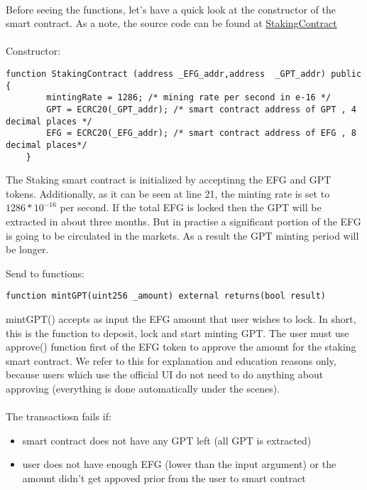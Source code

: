 \documentclass{article}
\begin{document}
\paragraph{ }
Before seeing the functions, let's have a quick look at the constructor of the smart contract. As a note, the source code can be found at \href{https://github.com/Defi-EFG/EFG-smart-contracts/blob/develop/lending/StakingContract.sol}{StakingContract}
\paragraph{}
Constructor:
\begin{lstlisting}[language=Solidity,firstnumber=20,escapechar=@]
 function StakingContract (address _EFG_addr,address  _GPT_addr) public {
        mintingRate = 1286; /* mining rate per second in e-16 */
        GPT = ECRC20(_GPT_addr); /* smart contract address of GPT , 4 decimal places */
        EFG = ECRC20(_EFG_addr); /* smart contract address of EFG , 8 decimal places*/
    }
\end{lstlisting}
The Staking smart contract is initialized by acceptinng the EFG and GPT tokens. Additionally, as it can be seen at line 21, the minting rate is set to $1286*10^{-16}$ per second. If the total EFG is locked then the GPT will be extracted in about three months. But in practise a significant portion of the EFG is going to be circulated in the markets. As a result the GPT minting period will be longer.

Send to functions:
\begin{lstlisting}[language=Solidity,firstnumber=42,escapechar=@]
function mintGPT(uint256 _amount) external returns(bool result)
\end{lstlisting}
mintGPT() accepts as input the EFG amount that user wishes to lock. In short, this is the function to deposit, lock and start minting GPT. The user must use approve() function first of the EFG token to approve the amount for the staking smart contract. We refer to this for explanation and education reasons only, because users which use the official UI do not need to do anything about approving (everything is done automatically under the scenes).
\paragraph{ }
The transactiosn fails if:
\begin{itemize}
\item smart contract does not have any GPT left (all GPT is extracted)
\item user does not have enough EFG (lower than the input argument) or the amount didn't get appoved prior from the user to smart contract
\end{itemize}
\end{document}
